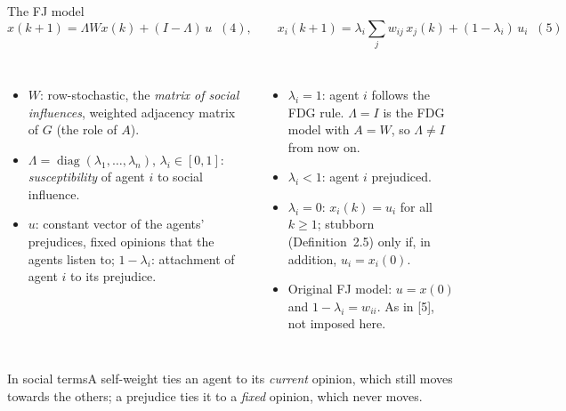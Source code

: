 \documentclass[10pt, aspectratio=169]{beamer}
\newcommand{\socially}[1]{%
  \begin{minipage}{0.76\textwidth}
    \begin{exampleblock}{In social terms}\footnotesize #1\end{exampleblock}
  \end{minipage}}
\begin{document}
\begin{frame}[label=m-fj-model]{The FJ model}
  \[ x(k+1) = \Lambda W x(k) + (I - \Lambda)\, u \;\; (4), \qquad
     x_i(k+1) = \lambda_i \textstyle\sum_{j} w_{ij}\, x_j(k) + (1-\lambda_i)\, u_i
     \;\; (5) \]
  \begin{columns}[T]
      \footnotesize
      \begin{itemize}
        \item $W$: row-stochastic, the \emph{matrix of social influences}, weighted
              adjacency matrix of $G$ (the role of $A$).
        \item $\Lambda = \operatorname{diag}(\lambda_1, \dots, \lambda_n)$,
              $\lambda_i \in [0,1]$: \emph{susceptibility} of agent $i$ to social
              influence.
        \item $u$: constant vector of the agents' \alert{prejudices}, fixed opinions that
              the agents listen to; $1 - \lambda_i$: \alert{attachment} of agent $i$ to its
              prejudice.
      \end{itemize}
      \footnotesize
      \begin{itemize}
        \item $\lambda_i = 1$: agent $i$ follows the FDG rule. $\Lambda = I$ is the FDG
              model with $A = W$, so $\Lambda \neq I$ from now on.
        \item $\lambda_i < 1$: agent $i$ \alert{prejudiced}.
        \item $\lambda_i = 0$: $x_i(k) = u_i$ for all $k \geq 1$; \alert{stubborn}
              (Definition~2.5) only if, in addition, $u_i = x_i(0)$.
        \item Original FJ model: $u = x(0)$ and $1 - \lambda_i = w_{ii}$. As in [5], not
              imposed here.
      \end{itemize}
  \end{columns}
  \vspace{3mm}
  \socially{A self-weight ties an agent to its \emph{current} opinion, which still moves
  towards the others; a prejudice ties it to a \emph{fixed} opinion, which never moves.}
\end{frame}
\end{document}
